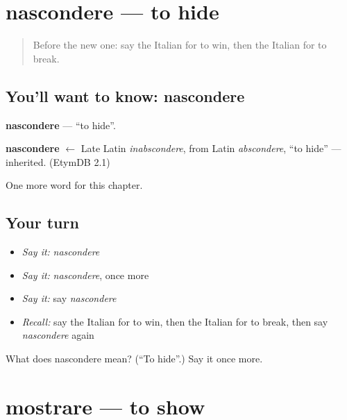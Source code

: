 \section[nascondere]{nascondere — to hide}

\label{lesson:IT-C142-nascondere}



\begin{quote}
Before the new one: say the Italian for to win, then the Italian for to break.
\end{quote}

\subsection*{You'll want to know: nascondere}
\textbf{nascondere} — \textquotedblleft{}to hide\textquotedblright{}.

\begin{cousinweb}
\textbf{nascondere} $\leftarrow$ Late Latin \emph{inabscondere}, from Latin \emph{abscondere}, \textquotedblleft{}to hide\textquotedblright{} — inherited. (EtymDB 2.1)
\end{cousinweb}

\begin{grammarlens}[title={What you've built}]
One more word for this chapter.
\end{grammarlens}

\subsection*{Your turn}
\begin{itemize}
\raggedright
  \item \emph{Say it:} \emph{nascondere}
  \item \emph{Say it:} \emph{nascondere}, once more
  \item \emph{Say it:} say \emph{nascondere}
  \item \emph{Recall:} say the Italian for to win, then the Italian for to break, then say \emph{nascondere} again
\end{itemize}

\begin{tcolorbox}[breakable,colback=teal!4,colframe=teal!35!black,title={Before you move on}]
What does nascondere mean? (\textquotedblleft{}To hide\textquotedblright{}.) Say it once more.
\end{tcolorbox}
\section[mostrare]{mostrare — to show}

